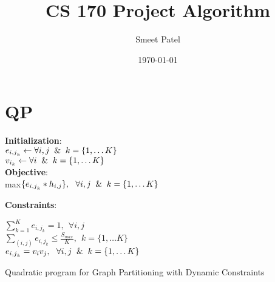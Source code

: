 \documentclass[13pt, letterpaper]{article}
\title{CS 170 Project Algorithm}
\author{Smeet Patel}
\date{\today}
\begin{document}
{\let\newpage\relax\maketitle} 
\maketitle


\section{QP}
\begin{algorithm}[H]

\SetAlgoLined
{}
 \vspace*{.1cm}
 \vspace*{.1cm}
 \textbf{Initialization}: \\
 $e_{{i,j}_k} \leftarrow \forall i,j \And k = \{1, \dots K\} $\\
 $v_{i_{k}} \leftarrow \forall i \And k = \{1, \dots K\}$\\ 
  \vspace*{.1cm}
 \textbf{Objective}: \\
 max$\{e_{{i,j}_{k}} * h_{i,j}\}, \ \ \forall i,j \And k = \{1, \dots K\}$

  \vspace*{.1cm}
 \textbf{Constraints}:

 \vspace*{.1cm}
$\sum_{k = 1}^{K} e_{{i,j}_{k}} = 1, \ \  \forall i,j $ \\
$\sum_{(i,j)} e_{{i,j}_{k}} \leq \frac{S_{max}}{K}, \ \ k = \{1, \dots K\}$\\
$e_{{i,j}_{k}} = v_{i}v_{j}, \ \ \forall i,j \And k = \{1, \dots K\}$
 \caption{Quadratic program for Graph Partitioning with Dynamic Constraints}
\end{algorithm}

 
\end{document}
